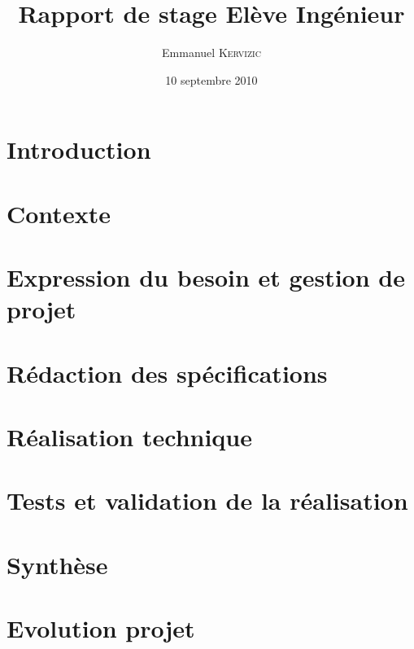 

\date{10 septembre 2010}
\title{Rapport de stage Elève Ingénieur}
\author{Emmanuel \textsc{Kervizic}}



\maketitle

\renewcommand{\baselinestretch}{0.8}\small \normalsize
\tableofcontents
\renewcommand{\baselinestretch}{1.18}\small \normalsize

\chapter{Introduction}


\chapter{Contexte}


\chapter{Expression du besoin et gestion de projet}



\chapter{Rédaction des spécifications}


\chapter{Réalisation technique}


\chapter{Tests et validation de la réalisation}


\chapter{Synthèse}


\chapter{Evolution projet}





\appendix
%

%
%





